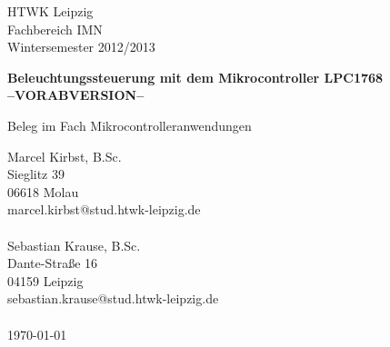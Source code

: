 \documentclass[a4paper,12pt]{scrartcl}
\begin{document}

\begin{titlepage}
HTWK Leipzig\\
Fachbereich IMN \\
Wintersemester 2012/2013




\begin{center}
\begin{Large}
\vfill {\textsf{\textbf{
Beleuchtungssteuerung mit dem Mikrocontroller LPC1768
\\--VORABVERSION--\\
}}}
\end{Large}
Beleg im Fach Mikrocontrolleranwendungen
\end{center}

\begin{small}
\vfill
Marcel Kirbst, B.Sc.\\
Sieglitz 39 \\
06618 Molau \\
marcel.kirbst@stud.htwk-leipzig.de\\
\\
Sebastian Krause, B.Sc.\\
Dante-Stra\ss{}e 16 \\
04159 Leipzig \\
sebastian.krause@stud.htwk-leipzig.de\\
\\
\today
\end{small}

\end{titlepage}
\addtolength{\voffset}{0cm}
\end{document}
